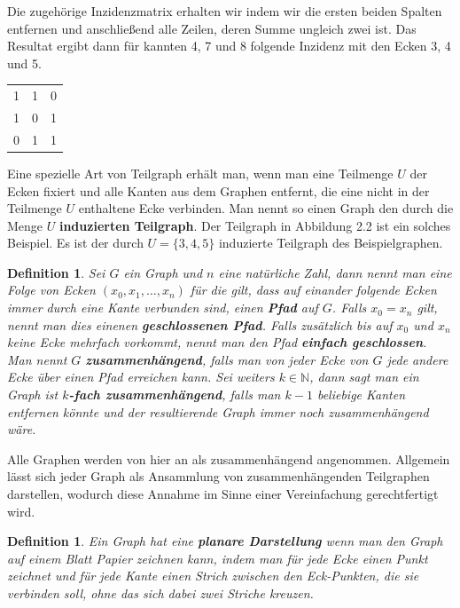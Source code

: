 \documentclass[11pt,a4paper,leqno]{report}
\newtheorem{definition}[theorem]{Definition}
\numberwithin{equation}{chapter}
\begin{document}
\noindent
Die zugeh\"orige Inzidenzmatrix erhalten wir indem wir die ersten beiden Spalten entfernen und anschlie{\ss}end alle Zeilen, deren Summe ungleich zwei ist. 
\noindent
Das Resultat ergibt dann f\"ur kannten 4, 7 und 8 folgende Inzidenz mit den Ecken 3, 4 und 5.
	\begin{center}
	\begin{tabular}{c c c}
		1 & 1 & 0\\
		1 & 0 & 1\\
		0 & 1 & 1\\
	\end{tabular} 
\end{center}
Eine spezielle Art von Teilgraph erh\"alt man, wenn man eine Teilmenge $U$ der Ecken fixiert und alle Kanten aus dem Graphen entfernt, die eine nicht in der Teilmenge $U$ enthaltene Ecke verbinden. Man nennt so einen Graph den durch die Menge $U$ \textbf{induzierten Teilgraph}. Der Teilgraph in Abbildung 2.2 ist ein solches Beispiel. Es ist der durch $U =\{3, 4, 5\}$ induzierte Teilgraph des Beispielgraphen.
\begin{definition}
	Sei $G$ ein Graph und $n$ eine nat\"urliche Zahl, dann nennt man eine Folge von Ecken $(x_0, x_1,\dots,x_n)$ f\"ur die gilt, dass auf einander folgende Ecken immer durch eine Kante verbunden sind, einen \textbf{Pfad} auf $G$. Falls $x_0 = x_n$ gilt, nennt man dies einenen \textbf{geschlossenen Pfad}. Falls zus\"atzlich bis auf $x_0$ und $x_n$ keine Ecke mehrfach vorkommt, nennt man den Pfad \textbf{einfach geschlossen}.\\
	Man nennt $G$ \textbf{zusammenh\"angend}, falls man von jeder Ecke von $G$ jede andere Ecke \"uber einen Pfad erreichen kann. Sei weiters $k\in\mathbb{N}$, dann sagt man ein Graph ist \textbf{$k$-fach zusammen\-h\"angend}, falls man $k - 1$ beliebige Kanten entfernen k\"onnte und der resultierende Graph immer noch zusammenh\"angend w\"are.
\end{definition}
\noindent
Alle Graphen werden von hier an als zusammenh\"angend angenommen. Allgemein l\"asst sich jeder Graph als Ansammlung von zusammenh\"angenden Teilgraphen darstellen, wodurch diese Annahme im Sinne einer Vereinfachung gerechtfertigt wird.
\begin{definition}
	Ein Graph hat eine \textbf{planare Darstellung} wenn man den Graph auf einem Blatt Papier zeichnen kann, indem man f\"ur jede Ecke einen Punkt zeichnet und f\"ur jede Kante einen Strich zwischen den Eck-Punkten, die sie verbinden soll, ohne das sich dabei zwei Striche kreuzen.
\end{definition}
\end{document}
